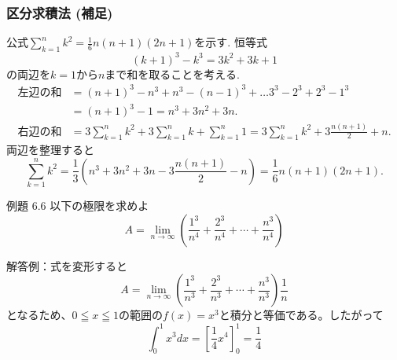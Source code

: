 
%
%
%
%
%
%
%
\begin{frame}
\frametitle{区分求積法 (補足)}

公式$\displaystyle \sum_{k=1}^n k^2=  \frac{1}{6}n(n+1)(2n+1)$を示す. 恒等式
$$
(k+1)^3-k^3=3k^2+3k+1
$$
の両辺を$k=1$から$n$まで和を取ることを考える. 
\begin{align*}
\text{左辺の和} & = (n+1)^3-n^3+n^3-(n-1)^3+\dots3^3-2^3+2^3-1^3\\
& = (n+1)^3-1=n^3+3n^2+3n. \\
\text{右辺の和} &= 3\sum_{k=1}^n k^2+3\sum_{k=1}^n k+\sum_{k=1}^n 1=  3\sum_{k=1}^n k^2+3\frac{n(n+1)}{2}+n. 
\end{align*}
両辺を整理すると
$$
\sum_{k=1}^n k^2 = \frac{1}{3}(n^3+3n^2+3n-3\frac{n(n+1)}{2}-n)
=  \frac{1}{6}n(n+1)(2n+1). 
$$

\end{frame}
\begin{slide}{例題 6.6}
以下の極限を求めよ
\begin{equation}
A=\lim_{n\to \infty}\left(\frac{1^3}{n^4} + \frac{2^3}{n^4} +\cdots + \frac{n^3}{n^4}\right) \nonumber
\end{equation}

解答例：式を変形すると
\begin{equation}
A = \lim_{n\to \infty} \left(\frac{1^3}{n^3} + \frac{2^3}{n^3} + \cdots + \frac{n^3}{n^3}\right)\frac{1}{n} \nonumber
\end{equation}
となるため、$0 \leqq x \leqq 1$の範囲の$f(x)=x^3$と積分と等価である。したがって
\begin{equation}
\int_0^1 x^3 dx = \left[\frac{1}{4}x^4 \right]_0^1 = \frac{1}{4} \nonumber
\end{equation}
\end{slide}

